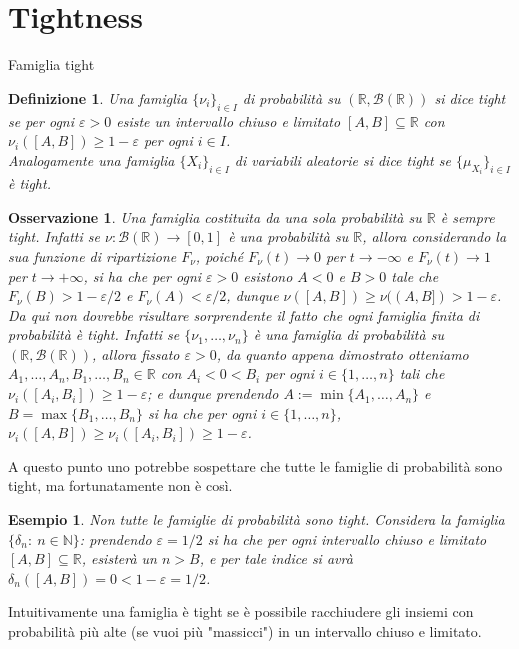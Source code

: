 \documentclass[11pt]{book}
\theoremstyle{Definizione}
\newtheorem*{mydef}{Definizione}
\theoremstyle{TeoremaProposizioneLemmaCorollario}
\theoremstyle{OsservazioneNota}
\newtheorem{myobs}{Osservazione}[section]
\newtheorem{myes}{Esempio}[section]
\newcommand{\R}{\mathbb{R}}
\newcommand{\N}{\mathbb{N}}
\begin{document}
\section{Tightness}
\begin{boxdef}{Famiglia tight}
\begin{mydef}
Una famiglia $\{\nu_i\}_{i\in I}$ di probabilità su $(\R,\mathcal{B}(\R))$ si dice tight se per ogni $\varepsilon > 0$ esiste un intervallo chiuso e limitato $[A,B]\subseteq \R$ con $\nu_i([A,B]) \geq 1-\varepsilon$ per ogni $i\in I$.\\
Analogamente una famiglia $\{X_i\}_{i\in I}$ di variabili aleatorie si dice tight se $\{\mu_{X_i}\}_{i\in I}$ è tight.
\end{mydef}
\end{boxdef}
\begin{myobs}
Una famiglia costituita da una sola probabilità su $\R$ è sempre tight. Infatti se $\nu:\mathcal{B}(\R)\longrightarrow [0,1]$ è una probabilità su $\R$, allora considerando la sua funzione di ripartizione $F_\nu$, poiché $F_\nu(t) \to 0$ per $t \to -\infty$ e $F_\nu(t) \to 1$ per $t \to +\infty$, si ha che per ogni $\varepsilon > 0$ esistono $A < 0$ e $B > 0$ tale che $F_\nu(B) > 1-\varepsilon/2$ e $F_\nu(A) < \varepsilon/2$, dunque $\nu([A,B]) \geq \nu((A,B]) > 1-\varepsilon$.\\
Da qui non dovrebbe risultare sorprendente il fatto che ogni famiglia finita di probabilità è tight. Infatti se $\{\nu_1,\dots,\nu_n\}$ è una famiglia di probabilità su $(\R,\mathcal{B}(\R))$, allora fissato $\varepsilon > 0$, da quanto appena dimostrato otteniamo $A_1,\dots,A_n,B_1,\dots,B_n\in \R$ con $A_i < 0 < B_i$ per ogni $i\in \{1,\dots,n\}$ tali che $\nu_i([A_i,B_i]) \geq 1-\varepsilon$; e dunque prendendo $A := \min\{A_1,\dots,A_n\}$ e $B = \max\{B_1,\dots,B_n\}$ si ha che per ogni $i\in \{1,\dots,n\}$, $\nu_i([A,B]) \geq \nu_i([A_i,B_i]) \geq 1-\varepsilon$.
\end{myobs}
A questo punto uno potrebbe sospettare che tutte le famiglie di probabilità sono tight, ma fortunatamente non è così.
\begin{myes}
Non tutte le famiglie di probabilità sono tight. Considera la famiglia $\{\delta_n:\ n\in \N\}$: prendendo $\varepsilon= 1/2$ si ha che per ogni intervallo chiuso e limitato $[A,B]\subseteq \R$, esisterà un $n > B$, e per tale indice si avrà $\delta_n([A,B]) = 0 < 1-\varepsilon = 1/2$.
\end{myes}
Intuitivamente una famiglia è tight se è possibile racchiudere gli insiemi con probabilità più alte (se vuoi più "massicci") in un intervallo chiuso e limitato.\\
\end{document}
